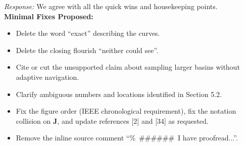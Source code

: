 \documentclass[10pt]{article}
\begin{document}
\textit{Response:} We agree with all the quick wins and housekeeping points. \\
\textbf{Minimal Fixes Proposed:}
\begin{itemize}
    \setlength{\itemsep}{0pt}
    \setlength{\parskip}{0pt}
    \item Delete the word ``exact'' describing the curves.
    \item Delete the closing flourish ``neither could see''.
    \item Cite or cut the unsupported claim about sampling larger basins without adaptive navigation.
    \item Clarify ambiguous numbers and locations identified in Section 5.2.
    \item Fix the figure order (IEEE chronological requirement), fix the notation collision on $\mathbf{J}$, and update references [2] and [34] as requested.
    \item Remove the inline source comment ``\%\ \#\#\#\#\#\#\ I have proofread...''.
\end{itemize}
\end{document}

